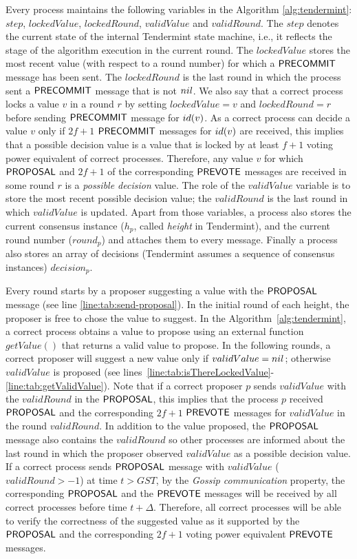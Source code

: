 Every process maintains the following variables in the Algorithm \ref{alg:tendermint}: $step$, $lockedValue$, $lockedRound$, $validValue$ and $validRound$. The $step$ denotes the current state of the internal Tendermint state machine, i.e., it reflects the stage of the algorithm execution in the current round. The $lockedValue$ stores the most recent value (with respect to a round number) for which a $\mathsf{PRECOMMIT}$ message has been sent. The $lockedRound$ is the last round in which the process sent a $\mathsf{PRECOMMIT}$ message that is not $nil$. We also say that a correct process locks a value $v$ in a round $r$ by setting $lockedValue = v$ and $lockedRound = r$ before sending $\mathsf{PRECOMMIT}$ message for $id(v)$. As a correct process can decide a value $v$ only if $2f+1$ $\mathsf{PRECOMMIT}$ messages for $id(v)$ are received, this implies that a possible decision value is a value that is locked by at least $f+1$ voting power equivalent of correct processes. Therefore, any value $v$ for which $\mathsf{PROPOSAL}$ and $2f+1$ of the corresponding $\mathsf{PREVOTE}$ messages are received in some round $r$ is a \emph{possible decision} value. The role of the $validValue$ variable is to store the most recent possible decision value; the $validRound$ is the last round in which $validValue$ is updated. Apart from those variables, a process also stores the current consensus instance ($h_p$, called \emph{height} in Tendermint), and the current round number ($round_p$) and attaches them to every message. Finally a process also stores an array of decisions (Tendermint assumes a sequence of consensus instances) $decision_p$. 

Every round starts by a proposer suggesting a value with the $\mathsf{PROPOSAL}$ message (see line \ref{line:tab:send-proposal}). In the initial round of each height, the proposer is free to chose the value to suggest. In the Algorithm~\ref{alg:tendermint}, a correct process obtains a value to propose using an external function    
$getValue()$ that returns a valid value to propose. In the following rounds, a correct proposer will suggest a new value only if $validValue = nil$; otherwise $validValue$ is proposed (see lines~\ref{line:tab:isThereLockedValue}-\ref{line:tab:getValidValue}). Note that if a correct proposer $p$ sends $validValue$ with the $validRound$ in the $\mathsf{PROPOSAL}$, this implies that the process $p$ received $\mathsf{PROPOSAL}$ and the corresponding $2f+1$ $\mathsf{PREVOTE}$ messages for $validValue$ in the round $validRound$. In addition to the value proposed, the $\mathsf{PROPOSAL}$ message also contains the $validRound$ so other processes are informed about the last round in which the proposer observed $validValue$ as a possible decision value.  
If a correct process sends $\mathsf{PROPOSAL}$ message with $validValue$ ($validRound > -1$) at time $t > GST$, by the \emph{Gossip communication} property, the corresponding $\mathsf{PROPOSAL}$ and the $\mathsf{PREVOTE}$ messages will be received by all correct processes before time $t+\Delta$. Therefore, all correct processes will be able to verify the correctness of the suggested value as it supported by the $\mathsf{PROPOSAL}$ and the corresponding $2f+1$ voting power equivalent $\mathsf{PREVOTE}$ messages.   

